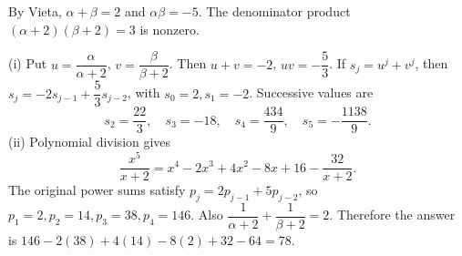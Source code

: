 By Vieta, $\alpha+\beta=2$ and $\alpha\beta=-5$. The denominator product $(\alpha+2)(\beta+2)=3$ is nonzero.

(i) Put $u=\dfrac{\alpha}{\alpha+2}$, $v=\dfrac{\beta}{\beta+2}$. Then $u+v=-2$, $uv=-\dfrac{5}{3}$. If $s_j=u^j+v^j$, then
$s_j=-2s_{j-1}+\dfrac{5}{3}s_{j-2}$, with $s_0=2,s_1=-2$. Successive values are
\[
s_2=\dfrac{22}{3},\quad s_3=-18,\quad s_4=\dfrac{434}{9},\quad
\boxed{s_5=-\dfrac{1138}{9}}.
\]
(ii) Polynomial division gives
\[
\dfrac{x^5}{x+2}=x^4-2x^3+4x^2-8x+16-\dfrac{32}{x+2}.
\]
The original power sums satisfy $p_j=2p_{j-1}+5p_{j-2}$, so $p_1=2,p_2=14,p_3=38,p_4=146$. Also $\dfrac{1}{\alpha+2}+\dfrac{1}{\beta+2}=2$. Therefore the answer is
$146-2(38)+4(14)-8(2)+32-64=\boxed{78}$.
